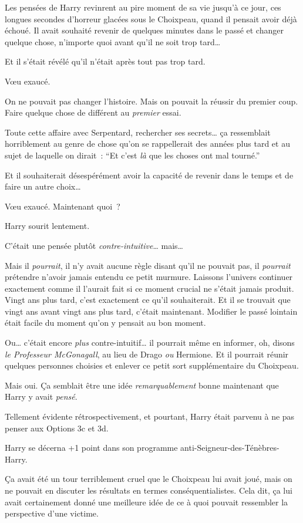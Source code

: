 Les pensées de Harry revinrent au pire moment de sa vie jusqu'à ce jour, ces longues secondes d'horreur glacées sous le Choixpeau, quand il pensait avoir déjà échoué. Il avait souhaité revenir de quelques minutes dans le passé et changer quelque chose, n'importe quoi avant qu'il ne soit trop tard…

Et il s'était révélé qu'il n'était après tout pas trop tard.

Vœu exaucé.

On ne pouvait pas changer l'histoire. Mais on pouvait la réussir du premier coup. Faire quelque chose de différent au \emph{premier} essai.

Toute cette affaire avec Serpentard, rechercher ses secrets… ça ressemblait horriblement au genre de chose qu'on se rappellerait des années plus tard et au sujet de laquelle on dirait~: “Et c'est \emph{là} que les choses ont mal tourné.”

Et il souhaiterait désespérément avoir la capacité de revenir dans le temps et de faire un autre choix…

Vœu exaucé. Maintenant quoi~?

Harry sourit lentement.

C'était une pensée plutôt \emph{contre-intuitive}… mais…

Mais il \emph{pourrait}, il n'y avait aucune règle disant qu'il ne pouvait pas, il \emph{pourrait} prétendre n'avoir jamais entendu ce petit murmure. Laissons l'univers continuer exactement comme il l'aurait fait si ce moment crucial ne s'était jamais produit. Vingt ans plus tard, c'est exactement ce qu'il souhaiterait. Et il se trouvait que vingt ans avant vingt ans plus tard, c'était maintenant. Modifier le passé lointain était facile du moment qu'on y pensait au bon moment.

Ou… c'était encore \emph{plus} contre-intuitif… il pourrait même en informer, oh, disons \emph{le Professeur McGonagall}, au lieu de Drago \emph{ou} Hermione. Et il pourrait réunir quelques personnes choisies et enlever ce petit sort supplémentaire du Choixpeau.

Mais oui. Ça semblait être une idée \emph{remarquablement} bonne maintenant que Harry y avait \emph{pensé}.

Tellement évidente rétrospectivement, et pourtant, Harry était parvenu à ne pas penser aux Options 3c et 3d.

Harry se décerna +1 point dans son programme anti-Seigneur-des-Ténèbres-Harry.

Ça avait été un tour terriblement cruel que le Choixpeau lui avait joué, mais on ne pouvait en discuter les résultats en termes conséquentialistes. Cela dit, ça lui avait certainement donné une meilleure idée de ce à quoi pouvait ressembler la perspective d'une victime.

